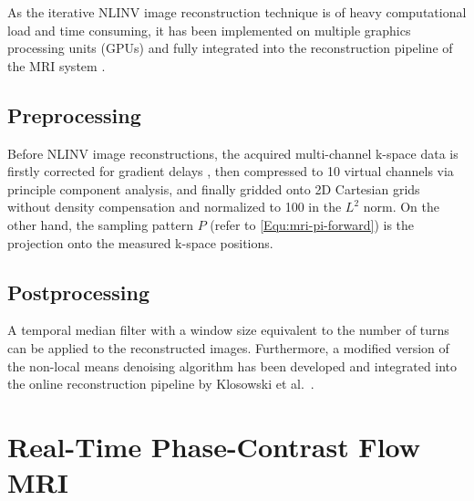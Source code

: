As the iterative NLINV image reconstruction technique is of heavy computational load and time consuming, it has been implemented on multiple graphics processing units (\acsp{GPU}) and fully integrated into the reconstruction pipeline of the MRI system \cite{2012_Schaetz}. 

\subsection*{Preprocessing}
Before NLINV image reconstructions, the acquired multi-channel k-space data is firstly corrected for gradient delays \cite{2011_GDC}, then compressed to \num{10} virtual channels via principle component analysis, and finally gridded onto 2D Cartesian grids without density compensation and normalized to \num{100} in the $L^2$ norm. On the other hand, the sampling pattern $P$ (refer to \cref{Equ:mri-pi-forward}) is the projection onto the measured k-space positions.

\subsection*{Postprocessing}
A temporal median filter with a window size equivalent to the number of turns can be applied to the reconstructed images. Furthermore, a modified version of the non-local means denoising \cite{2005_NLM} algorithm has been developed and integrated into the online reconstruction pipeline by Klosowski et al.~\cite{2016_NLM}. 


\section{Real-Time Phase-Contrast Flow MRI} \label{Sec:rtmri-pc}

